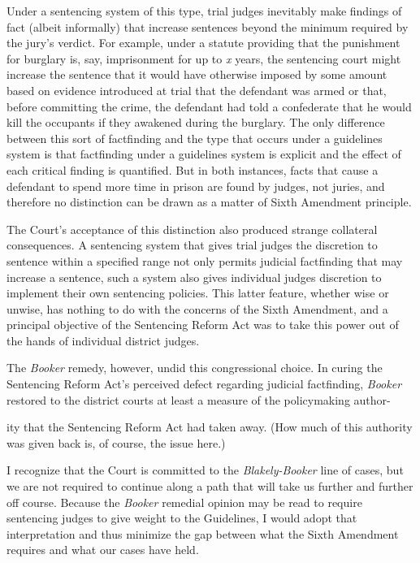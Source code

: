\newpage 

  Under a sentencing system of this type, trial judges inevitably make
findings of fact (albeit informally) that increase sentences beyond the
minimum required by the jury's verdict. For example, under a statute
providing that the punishment for burglary is, say, imprisonment for up
to \emph{x} years, the sentencing court might increase the sentence that it
would have otherwise imposed by some amount based on evidence introduced
at trial that the defendant was armed or that, before committing the
crime, the defendant had told a confederate that he would kill the
occupants if they awakened during the burglary. The only difference
between this sort of factfinding and the type that occurs under a
guidelines system is that factfinding under a guidelines system is
explicit and the effect of each critical finding is quantified. But
in both instances, facts that cause a defendant to spend more time in
prison are found by judges, not juries, and therefore no distinction can
be drawn as a matter of Sixth Amendment principle.

  The Court's acceptance of this distinction also produced strange
collateral consequences. A sentencing system that gives trial judges
the discretion to sentence within a specified range not only permits
judicial factfinding that may increase a sentence, such a system also
gives individual judges discretion to implement their own sentencing
policies. This latter feature, whether wise or unwise, has nothing to
do with the concerns of the Sixth Amendment, and a principal objective
of the Sentencing Reform Act was to take this power out of the hands of
individual district judges.

  The \emph{Booker} remedy, however, undid this congressional choice. In
curing the Sentencing Reform Act's perceived defect regarding judicial
factfinding, \emph{Booker} restored to the district courts at least a
measure of the policymaking author-


\newpage 

\noindent ity that the Sentencing Reform Act had taken away. (How much of this
authority was given back is, of course, the issue here.)

  I recognize that the Court is committed to the \emph{Blakely-Booker} line
of cases, but we are not required to continue along a path that will
take us further and further off course. Because the \emph{Booker} remedial
opinion may be read to require sentencing judges to give weight to the
Guidelines, I would adopt that interpretation and thus minimize the gap
between what the Sixth Amendment requires and what our cases have held.

